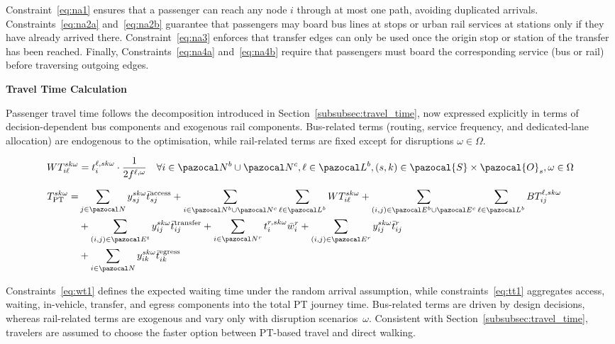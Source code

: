 \documentclass[3p,times,procedia]{elsarticle}
\begin{document}
Constraint~\eqref{eq:na1} ensures that a passenger can reach any node $i$ through at most one path, avoiding duplicated arrivals.  
Constraints~\eqref{eq:na2a} and~\eqref{eq:na2b} guarantee that passengers may board bus lines at stops or urban rail services at stations only if they have already arrived there.  
Constraint~\eqref{eq:na3} enforces that transfer edges can only be used once the origin stop or station of the transfer has been reached.  
Finally, Constraints~\eqref{eq:na4a} and~\eqref{eq:na4b} require that passengers must board the corresponding service (bus or rail) before traversing outgoing edges.  

\textbf{Travel Time Calculation}

Passenger travel time follows the decomposition introduced in Section~\ref{subsubsec:travel_time}, now expressed explicitly in terms of decision-dependent bus components and exogenous rail components. Bus-related terms (routing, service frequency, and dedicated-lane allocation) are endogenous to the optimisation, while rail-related terms are fixed except for disruptions $\omega \in \Omega$. 

\begin{align}
WT_{i\ell}^{sk\omega} &= t_{i}^{\ell,sk\omega} \cdot \frac{1}{2f^{\ell,\omega}}
\quad \forall i \in \pazocal N^b \cup \pazocal N^c, \ell \in \pazocal L^b, (s,k)\in \pazocal{S}\times\pazocal{O}_s, \omega \in \Omega \label{eq:wt1} \\[6pt]
T^{sk\omega}_{\text{PT}} =& \sum_{j \in \pazocal N} y_{sj}^{sk\omega} \bar{t}_{sj}^{\text{access}}
+ \sum_{i \in \pazocal N^b \cup \pazocal N^c} \sum_{\ell \in \pazocal L^b} WT_{i\ell}^{sk\omega}
+ \sum_{(i,j) \in \pazocal E^b \cup \pazocal E^c} \sum_{\ell \in \pazocal L^b} BT_{ij}^{\ell,sk\omega} \notag \\
&+ \sum_{(i,j) \in \pazocal E^{t}} y_{ij}^{sk\omega} \bar{t}_{ij}^{\text{transfer}}
+ \sum_{i \in \pazocal N^r} t_{i}^{r,sk\omega} \bar{w}_i^{r}
+ \sum_{(i,j) \in \pazocal E^r} y_{ij}^{sk\omega} \bar{t}_{ij}^{r} \notag \\
&+ \sum_{i \in \pazocal N} y_{ik}^{sk\omega} \bar{t}_{ik}^{\text{egress}} \label{eq:tt1}
\end{align}

Constraints~\eqref{eq:wt1} defines the expected waiting time under the random arrival assumption, 
while constraints~\eqref{eq:tt1} aggregates access, waiting, in-vehicle, transfer, and egress components into the total PT journey time. 
Bus-related terms are driven by design decisions, whereas rail-related terms are exogenous and vary only with disruption scenarios~$\omega$. 
Consistent with Section~\ref{subsubsec:travel_time}, travelers are assumed to choose the faster option between PT-based travel and direct walking.
\end{document}
